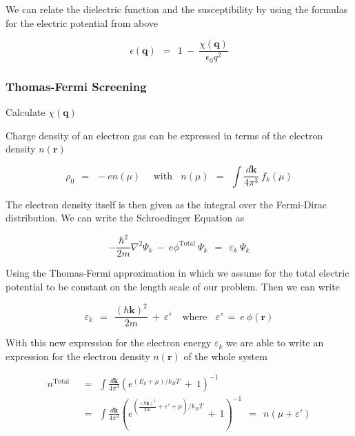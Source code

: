 \documentclass[10pt]{report}
\numberwithin{equation}{chapter}
\begin{document}
We can relate the dielectric function and the susceptibility  by using the formulas for the electric potential from above

\begin{equation}
  \epsilon(\mathbf{q}) ~~=~~ 1 ~-~ \frac{\chi(\mathbf{q})}{\epsilon_0 q^2}
\end{equation}


\subsubsection{Thomas-Fermi Screening}

Calculate $\chi(\mathbf{q})$


Charge density of an electron gas can be expressed in terms of the electron density $n(\mathbf{r})$

\begin{equation}
  \rho_0 ~~=~~ -e n(\mu) ~~~~~~\text{with}~~~~ 
  n(\mu) ~~=~~ \int \frac{d \mathbf{k}}{4\pi^3}\ f_k(\mu)
\end{equation}

The electron density itself is then given as the integral over the Fermi-Dirac distribution. We can write the Schroedinger Equation as 

\begin{equation} \label{eq:screen_hamiltonian}
  -\frac{\hbar^2}{2m} \nabla^2 \Psi_k ~-~ e\phi^\text{Total}\ \Psi_k ~~=~~ \varepsilon_k\ \Psi_k
\end{equation}

Using the Thomas-Fermi approximation in which we assume for the total electric potential to be constant on the length scale of our problem. Then we can write

\begin{equation}
  \varepsilon_k ~~=~~ \frac{(\hbar \mathbf{k})^2}{2m} ~+~ \varepsilon' ~~~~~\text{where}~~~~
  \varepsilon' ~=~ e\ \phi(\mathbf{r})
\end{equation}

With this new expression for the electron energy $\varepsilon_k$ we are able to write an expression for the electron density $n(\mathbf{r})$ of the whole system

\begin{align}
  n^\text{Total} ~~& =~~ \int \frac{d \mathbf{k}}{4\pi^3} \left(e^{(E_k + \mu)/k_BT} ~+~ 1 \right)^{-1} \nonumber \\
  ~~& =~~ \int \frac{d \mathbf{k}}{4\pi^3} \left(e^{(\frac{(\hbar \mathbf{k})^2}{2m} + \varepsilon' + \mu)/k_BT} ~+~ 1 \right)^{-1} 
  ~~=~~ n(\mu + \varepsilon')
\end{align}
\end{document}
